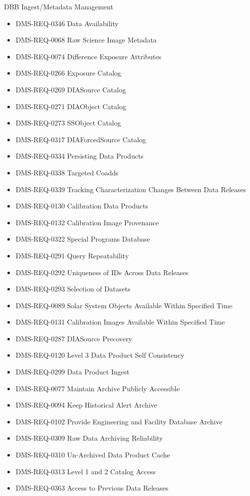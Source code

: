 DBB Ingest/Metadata Management \begin{itemize}
\item DMS-REQ-0346 Data Availability
\item DMS-REQ-0068 Raw Science Image Metadata
\item DMS-REQ-0074 Difference Exposure Attributes
\item DMS-REQ-0266 Exposure Catalog
\item DMS-REQ-0269 DIASource Catalog
\item DMS-REQ-0271 DIAObject Catalog
\item DMS-REQ-0273 SSObject Catalog
\item DMS-REQ-0317 DIAForcedSource Catalog
\item DMS-REQ-0334 Persisting Data Products
\item DMS-REQ-0338 Targeted Coadds
\item DMS-REQ-0339 Tracking Characterization Changes Between Data Releases
\item DMS-REQ-0130 Calibration Data Products
\item DMS-REQ-0132 Calibration Image Provenance
\item DMS-REQ-0322 Special Programs Database
\item DMS-REQ-0291 Query Repeatability
\item DMS-REQ-0292 Uniqueness of IDs Across Data Releases
\item DMS-REQ-0293 Selection of Datasets
\item DMS-REQ-0089 Solar System Objects Available Within Specified Time
\item DMS-REQ-0131 Calibration Images Available Within Specified Time
\item DMS-REQ-0287 DIASource Precovery
\item DMS-REQ-0120 Level 3 Data Product Self Consistency
\item DMS-REQ-0299 Data Product Ingest
\item DMS-REQ-0077 Maintain Archive Publicly Accessible
\item DMS-REQ-0094 Keep Historical Alert Archive
\item DMS-REQ-0102 Provide Engineering and Facility Database Archive
\item DMS-REQ-0309 Raw Data Archiving Reliability
\item DMS-REQ-0310 Un-Archived Data Product Cache
\item DMS-REQ-0313 Level 1 and 2 Catalog Access
\item DMS-REQ-0363 Access to Previous Data Releases

\end{itemize}
